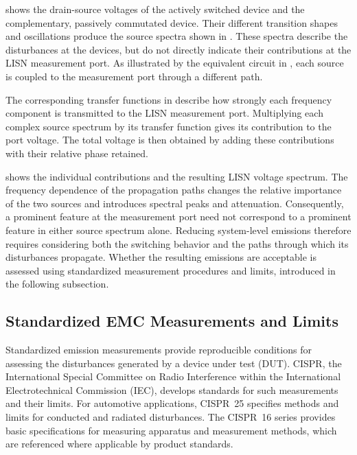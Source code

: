  shows the drain-source voltages of the actively switched device and the complementary, passively commutated device.
Their different transition shapes and oscillations produce the source spectra shown in .
These spectra describe the disturbances at the devices, but do not directly indicate their contributions at the LISN measurement port.
As illustrated by the equivalent circuit in , each source is coupled to the measurement port through a different path.

The corresponding transfer functions in  describe how strongly each frequency component is transmitted to the LISN measurement port.
Multiplying each complex source spectrum by its transfer function gives its contribution to the port voltage.
The total voltage is then obtained by adding these contributions with their relative phase retained.


 shows the individual contributions and the resulting LISN voltage spectrum.
The frequency dependence of the propagation paths changes the relative importance of the two sources and introduces spectral peaks and attenuation.
Consequently, a prominent feature at the measurement port need not correspond to a prominent feature in either source spectrum alone.
Reducing system-level emissions therefore requires considering both the switching behavior and the paths through which its disturbances propagate.
Whether the resulting emissions are acceptable is assessed using standardized measurement procedures and limits, introduced in the following subsection.

\FloatBarrier

\subsection{Standardized EMC Measurements and Limits}
Standardized emission measurements provide reproducible conditions for assessing the disturbances generated by a device under test (DUT).
CISPR, the International Special Committee on Radio Interference within the International Electrotechnical Commission (IEC), develops standards for such measurements and their limits.
For automotive applications, CISPR~25 specifies methods and limits for conducted and radiated disturbances.
The CISPR~16 series provides basic specifications for measuring apparatus and measurement methods, which are referenced where applicable by product standards.

